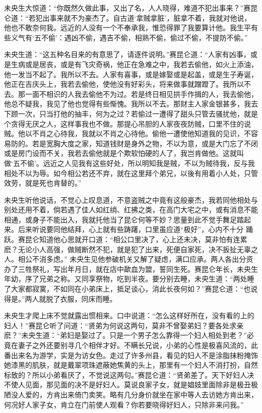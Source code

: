 \documentclass[a4paper,12pt,UTF8,twoside]{ctexbook}
\begin{document}
未央生大惊道：“你既然久做此事，又出了名，人人晓得，难道不犯出事来？”赛昆仑道：“若犯出事来就不为豪杰了。自古道‘拿贼拿脏’，脏拿不着，我就对他说，他也不敢奈何我。远近的人没有一个不奉承我，惟恐得罪了我要算计他。我生平有些义气有‘五不偷’：遇凶不偷，遇吉不偷，相熟不偷，偷过不偷，不提防不偷。”

未央生道：“这五种名目来的有意思了，请逐件说明。”赛昆仑道：“人家有凶事，或是生病或是居丧，或是有飞灾奇祸，他正在急难之中，我若去偷他，如火上添油，他一发当不起了。我所以不去。人家有喜事，或是嫁娶或是起盖，或是生子寿诞，他正在吉庆头上，我若去偷他，使他没有好彩头，将来做事就蹭蹬了。我所以不去。那一面不相识的人我去偷他不为过。若是终日相见拱手作揖的人，我去偷他，他总不疑我，我见了他也觉得有些惭愧。我所以不去。那财主人家金银甚多，我去下顾一次，只当打他的抽丰，何为之过？若偷过一遭得了甜头只管去骚扰他，就是个贪得无厌之人，这样事我也不做。那提心吊胆的人家夜夜防贼，口里不住的说贼。他以不肖之心待我，我就以不肖之心待他。偷他一遭使他知道我的见识，不容易防的。若是宽胸大度之家，知道钱财是身外之物，不以为意，或是大门忘了不闭或是房门设而不关，我若去偷他就是个欺软怕硬的人了，我岂肯做他。这就叫做‘五不偷’。远近之人见我有这些好处，所以明知我是贼，不以为贼待我，反与我相处不以为辱。如今相公若还不弃，就在这里拜个弟兄，以後有用着小人处，只管效劳，就是死也肯替的。”

未央生听他说话，不觉心上叹息道，不意盗贼之中竟有这般豪杰，我若同他相处与别处还用不着，倘若遇了佳人如红绡、红拂之类，在高门大宅之中，或有消息不能相通，或身子不能出入，我就托他当了昆仑何等不妙？思量到此不觉手舞足踏起来。后来听说要同他结拜，心上就有些踌躇，口里虽应道“极好”，心内不十分 踊跃。赛昆仑知道他心思就开口道：“相公口里决了，心上还未决，莫非怕有连累麽？无论小人高强，做贼断然不犯，就是犯了出来，死便自家死，决不扳扯无辜之人。相公不消多虑。” 未央生见他参破机关又解了疑虑，满口应承。两人各出分资办了三牲祭礼，写出年月日，就在店中歃血为盟，誓同生死。赛昆仑年长，未央生年幼，序了兄弟之称。又同享祭物，吃到半夜。要分别去睡，未央生道：“两处睡了大家都寂寞，不如同在小弟床上，抵足谈心，消此长夜何如？”赛昆仑道：“也说得是。”两人就脱了衣服，同床而睡。

未央生才爬上床不觉就露出惯相来。口中说道：“怎么这样好所在，没有看的上的妇人！”赛昆仑听了问道：“贤弟为何说这两句，莫非不曾娶弟妇？要各处求亲麽？”未央生道：“弟妇是娶过了。只是一个男子怎么靠得一个妇人相处到老？”必竟在妻子之外还要别寻几个相伴才好。不瞒长兄说，小弟的心性是极喜风流的，此番出来名为游学，实是为访女色。走过了许多州县，看见的妇人不是涂脂抹粉掩饰她漆黑的肌肤，就是戴翠项珠遮蔽她焦黄的头上，那里有一个妇人不消打扮，自然标致的？所以小弟看厌了，不觉说这两句。”赛昆仑道：“贤弟差了。天下好妇人决不使人见面，那见面的决不是好妇人。莫说良家子女，就是娼妓里面除非是极丑极陋没人爱的，方肯出来倚门卖笑。略有几分身价就坐在家中等人去访她方肯出来，何况好人家子女，肯立在门前使人观看？你若要晓得好妇人，只除非来问我。”
\end{document}
